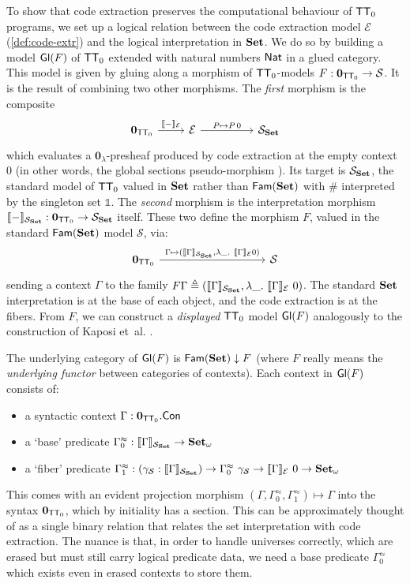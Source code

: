 \documentclass[10pt,a4paper]{article}
\theoremstyle{definition}
\theoremstyle{remark}
\newcommand{\s}[1]{{\ensuremath{\textsf{\upshape #1}}}\xspace}
\newcommand{\cl}[1]{{\ensuremath{\mathcal{#1}}}\xspace}
\newcommand{\re}[1]{{\ensuremath{\mathbf{#1}}}\xspace}
\newcommand{\mth}[1]{\ensuremath{\textbf{\upshape #1}}\xspace}
\newcommand{\Set}{\mth{Set}}
\newcommand{\Con}{\s{Con}}
\newcommand{\Unit}{\mathbb{1}}
\newcommand{\llb}[1]{\llbracket{#1}\rrbracket}
\newcommand{\ZTT}{\ensuremath{\s{TT}_0}\xspace}
\begin{document}
To show that code extraction preserves the computational behaviour of \ZTT
programs, we set up a logical relation between the code extraction model $\cl E$
(\cref{def:code-extr}) and the logical interpretation in $\Set$. We do so by
building a model $\s{Gl}(F)$ of \ZTT extended with natural numbers $\s{Nat}$ in
a glued category. This model is given by gluing along a morphism of
$\ZTT$-models $F : \re 0_{\ZTT} \to \cl S$. It is the result of combining two
other morphisms. The \emph{first} morphism is the composite
\[
\begin{tikzcd}
  \re 0_{\ZTT} \ar[r, "{{\llb-_{\cl E}}}"] & \cl E \ar[rr, "P \mapsto P\,0"]
  & & \cl S_{\Set}
\end{tikzcd}
\]
which evaluates a $\re 0_\lambda$-presheaf produced by code
extraction at the empty context $0$ (in other words, the global sections pseudo-morphism \cite{Kaposi2019-lp}).
Its target is $\cl S_\Set$, the standard model of \ZTT valued in \Set rather than $\s{Fam}(\Set)$ with $\#$
interpreted by the singleton set $\Unit$.
The \emph{second} morphism is the interpretation morphism $\llb{-}_{\cl S_{\Set}} : \re 0_{\ZTT}
\to \cl S_\Set$ itself. These two define the morphism $F$,
valued in the standard $\s{Fam}(\Set)$ model $\cl S$, via:
\[
\begin{tikzcd}
  \re 0_{\ZTT} \ar[rrrr, "{\Gamma \mapsto (\llb{\Gamma}_{\cl S_\Set}, \lambda \_.\ \llb{\Gamma}_{\cl E} 0)}"] & & & & \cl S
\end{tikzcd}
\]
sending a context $\Gamma$ to the family $F \Gamma \triangleq (\llb{\Gamma}_{\cl S_\Set}, \lambda
\_.\ \llb{\Gamma}_{\cl E}\ 0)$. The standard $\Set$ interpretation is at
the base of each object, and the code extraction is at the fibers. From $F$,
we can construct a \emph{displayed} $\ZTT$ model $\s{Gl}(F)$ analogously
to the construction of Kaposi et~al. \cite{Kaposi2019-lp}.

The underlying category of $\s{Gl}(F)$ is $\s{Fam}(\Set) \downarrow F$
(where $F$ really means the \emph{underlying functor} between categories of
contexts). Each context in $\s{Gl}(F)$ consists of:
\begin{itemize}
\item a syntactic context $\Gamma : \re 0_{\ZTT}.\Con$
\item a `base' predicate $\Gamma^{\approx}_0 : \llb{\Gamma}_{\cl S_\Set} \to \Set_{\omega}$
\item a `fiber' predicate $\Gamma^{\approx}_1 : (\gamma_{\cl S} : \llb{\Gamma}_{\cl S_\Set}) \to \Gamma^{\approx}_0\ \gamma_{\cl S} \to \llb{\Gamma}_{\cl E}\ 0 \to \Set_{\omega}$
\end{itemize}
This comes with an evident projection morphism $(\Gamma, \Gamma^{\approx}_0, \Gamma^{\approx}_1)
\mapsto \Gamma$ into the syntax $\re 0_{\ZTT}$, which by initiality has a
section. This can be approximately thought of as a single binary relation
that relates the set interpretation with code extraction. The nuance is that,
in order to handle universes correctly, which are erased but must still carry
logical predicate data, we need a base predicate $\Gamma^{\approx}_0$ which exists even in
erased contexts to store them.
\end{document}
